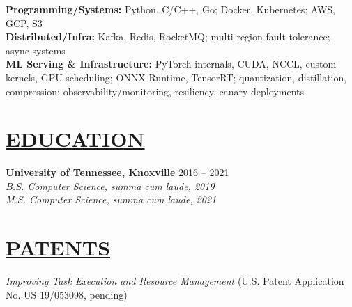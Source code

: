 \documentclass[overlapped,line,11pt]{res}
\begin{document}
\begin{resume}
\textbf{Programming/Systems:} Python, C/C++, Go; Docker, Kubernetes; AWS, GCP, S3 \\
\textbf{Distributed/Infra:} Kafka, Redis, RocketMQ; multi-region fault tolerance; async systems \\
\textbf{ML Serving \& Infrastructure:} PyTorch internals, CUDA, NCCL, custom kernels, GPU scheduling; ONNX Runtime, TensorRT; quantization, distillation, compression; observability/monitoring, resiliency, canary deployments




\section{\underline{EDUCATION}}
\vspace{4pt}

\textbf{University of Tennessee, Knoxville} \hfill 2016 – 2021 \\
{\sl B.S. Computer Science, summa cum laude, 2019} \\
{\sl M.S. Computer Science, summa cum laude, 2021}


\section{\underline{PATENTS}}
\vspace{4pt}
{\sl Improving Task Execution and Resource Management} (U.S. Patent Application No. US 19/053098, pending)

\end{resume}
\end{document}
